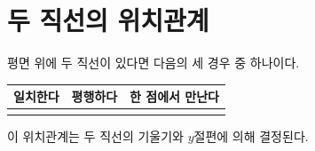 \documentclass{oblivoir}
\begin{document}
\section{두 직선의 위치관계}
평면 위에 두 직선이 있다면 다음의 세 경우 중 하나이다.
\par\bigskip\noindent
\begin{tabu}{X[2,c]|X[2,c]|X[2,c]}
\toprule
일치한다	&평행하다	&한 점에서 만난다\\
\hline
&
&
\\\bottomrule
\end{tabu}
\par\bigskip
이 위치관계는 두 직선의 기울기와 \(y\)절편에 의해 결정된다.
\end{document}
